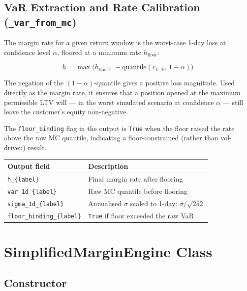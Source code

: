 \documentclass[9pt, a4paper]{extarticle}
\newenvironment{formulabox}{\par\addvspace{4pt}}{\par\addvspace{4pt}}
\begin{document}
\subsection{VaR Extraction and Rate Calibration (\texttt{\_var\_from\_mc})}

The margin rate for a given return window is the worst-case 1-day loss at
confidence level $\alpha$, floored at a minimum rate $h_{\mathrm{floor}}$:

\begin{formulabox}
\[
    h = \max\!\bigl(h_{\mathrm{floor}},\;
        -\mathrm{quantile}(r_{1:N},\, 1-\alpha)\bigr)
\]
\end{formulabox}

The negation of the $(1-\alpha)$-quantile gives a positive loss magnitude.
Used directly as the margin rate, it ensures that a position opened at the
maximum permissible LTV will — in the worst simulated scenario at confidence
$\alpha$ — still leave the customer's equity non-negative.

The \texttt{floor\_binding} flag in the output is \texttt{True} when the floor
raised the rate above the raw MC quantile, indicating a floor-constrained
(rather than vol-driven) result.

\begin{tabularx}{\linewidth}{lX}
\toprule
\textbf{Output field} & \textbf{Description} \\
\midrule
\texttt{h\_\{label\}}             & Final margin rate after flooring \\
\texttt{var\_1d\_\{label\}}       & Raw MC quantile before flooring \\
\texttt{sigma\_1d\_\{label\}}     & Annualised $\sigma$ scaled to 1-day: $\sigma/\sqrt{252}$ \\
\texttt{floor\_binding\_\{label\}}& \texttt{True} if floor exceeded the raw VaR \\
\bottomrule
\end{tabularx}

\section{SimplifiedMarginEngine Class}
\label{sec:engine}

\subsection{Constructor}
\end{document}
